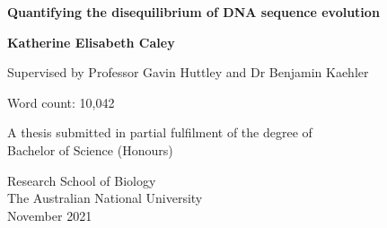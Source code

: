 \begin{titlepage}
   \begin{center}
   
    \vspace*{1cm}
    \LARGE
    
    \textbf{Quantifying the disequilibrium of DNA sequence evolution}
    
    
    \vspace{2cm}
    
    \large

    \textbf{Katherine Elisabeth Caley}
    
    Supervised by Professor Gavin Huttley and Dr Benjamin Kaehler
    
    \vfill
    
    \normalsize
    
    Word count: 10,042

   \vspace{1.5cm}

    A thesis submitted in partial fulfilment of the degree of \\
    Bachelor of Science (Honours)   
    
    \vspace{2cm}
    
    Research School of Biology\\
    
    The Australian National University\\
    
    November 2021
    
    \vspace{0.8cm}
    
    
   \end{center}
\end{titlepage}